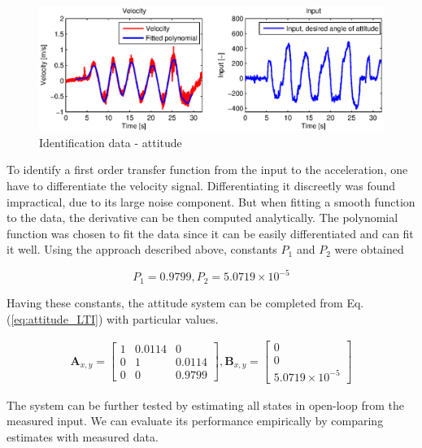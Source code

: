 \begin{figure}[h]
\includegraphics[width=1\textwidth]{fig/iden1.eps} 
\caption{Identification data - attitude}
\label{fig:iden1}
\end{figure}

To identify a first order transfer function from the input to the acceleration, one have to differentiate the velocity signal. Differentiating it discreetly was found impractical, due to its large noise component. But when fitting a smooth function to the data, the derivative can be then computed analytically. The polynomial function was chosen to fit the data since it can be easily differentiated and can fit it well. Using the approach described above, constants $P_1$ and $P_2$ were obtained

\begin{equation}
P_1 = 0.9799, P_2 = 5.0719 \times 10^{-5} 
\label{eq:constants1}
\end{equation}

Having these constants, the attitude system can be completed from Eq. (\ref{eq:attitude_LTI}) with particular values. 

\begin{equation}
\begin{split}
\mathbf{A}_{x, y} = \begin{bmatrix}
1 & 0.0114 & 0 \\
0 & 1 & 0.0114 \\
0 & 0 & 0.9799
\end{bmatrix}, \mathbf{B}_{x, y} = \begin{bmatrix}
0\\
0\\
5.0719 \times 10^{-5}
\end{bmatrix}
\end{split}
\label{eq:attitude_LTI_identified}
\end{equation}

The system can be further tested by estimating all states in open-loop from the measured input. We can evaluate its performance empirically by comparing estimates with measured data.

